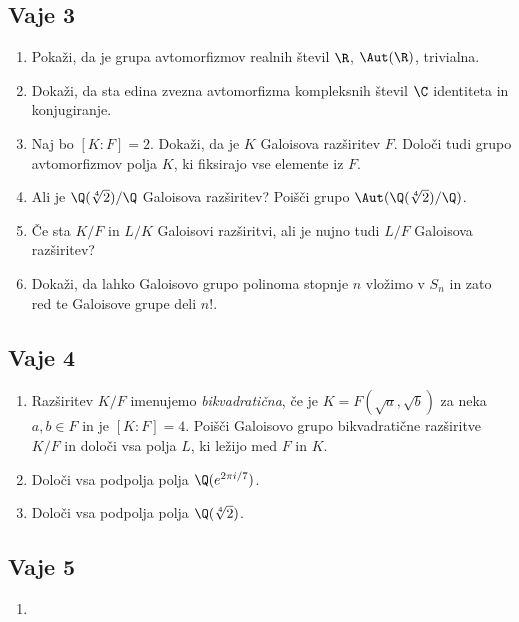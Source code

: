\subsection*{Vaje 3}

\begin{enumerate}
    \item Pokaži, da je grupa avtomorfizmov realnih števil $\R$, $\Aut(\R)$, trivialna.
    \item Dokaži, da sta edina zvezna avtomorfizma kompleksnih števil $\C$ identiteta in konjugiranje.
    \item Naj bo $[K : F] = 2$. Dokaži, da je $K$ Galoisova razširitev $F$. 
    Določi tudi grupo avtomorfizmov polja $K$, ki fiksirajo vse elemente iz $F$.
    \item Ali je $\Q(\sqrt[4]{2})/\Q$ Galoisova razširitev? 
    Poišči grupo $\Aut(\Q(\sqrt[4]{2})/\Q)$.
    \item Če sta $K/F$ in $L/K$ Galoisovi razširitvi, ali je nujno tudi $L/F$ Galoisova razširitev?
    \item Dokaži, da lahko Galoisovo grupo polinoma stopnje $n$ vložimo v $S_n$ in 
    zato red te Galoisove grupe deli $n!$.
\end{enumerate}


\newpage
\subsection*{Vaje 4}

\begin{enumerate}
    \item Razširitev $K/F$ imenujemo \emph{bikvadratična}, če je $K = F(\sqrt{a}, \sqrt{b})$ 
    za neka $a, b \in F$ in je $[K:F] = 4$. Poišči Galoisovo grupo bikvadratične razširitve 
    $K/F$ in določi vsa polja $L$, ki ležijo med $F$ in $K$.

    \item Določi vsa podpolja polja $\Q(e^{2\pi i/7})$.
    
    \item Določi vsa podpolja polja $\Q(\sqrt[4]{2})$.
\end{enumerate}

\newpage
\subsection*{Vaje 5}

\begin{enumerate}
    \item 
\end{enumerate}


